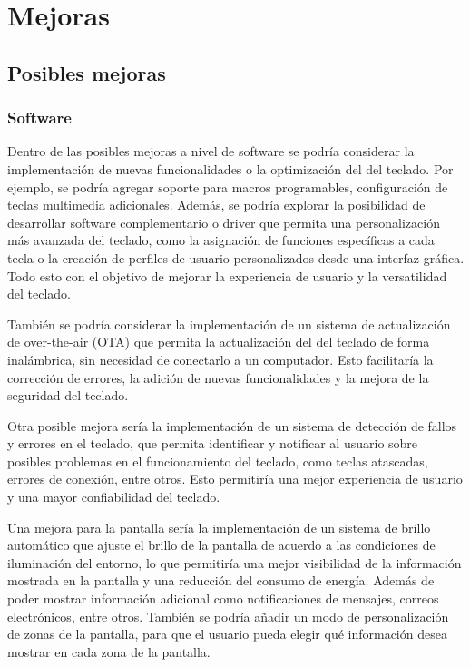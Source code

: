 \chapter{Mejoras}

\section{Posibles mejoras}
\subsection{Software}
Dentro de las posibles mejoras a nivel de software se podría considerar la implementación de nuevas funcionalidades o la optimización del  del teclado. Por ejemplo, se podría agregar soporte para macros programables, configuración de teclas multimedia adicionales. Además, se podría explorar la posibilidad de desarrollar software complementario o driver que permita una personalización más avanzada del teclado, como la asignación de funciones específicas a cada tecla o la creación de perfiles de usuario personalizados desde una interfaz gráfica. Todo esto con el objetivo de mejorar la experiencia de usuario y la versatilidad del teclado.

También se podría considerar la implementación de un sistema de actualización de  over-the-air (OTA) que permita la actualización del  del teclado de forma inalámbrica, sin necesidad de conectarlo a un computador. Esto facilitaría la corrección de errores, la adición de nuevas funcionalidades y la mejora de la seguridad del teclado.

Otra posible mejora sería la implementación de un sistema de detección de fallos y errores en el teclado, que permita identificar y notificar al usuario sobre posibles problemas en el funcionamiento del teclado, como teclas atascadas, errores de conexión, entre otros. Esto permitiría una mejor experiencia de usuario y una mayor confiabilidad del teclado.

Una mejora para la pantalla sería la implementación de un sistema de brillo automático que ajuste el brillo de la pantalla de acuerdo a las condiciones de iluminación del entorno, lo que permitiría una mejor visibilidad de la información mostrada en la pantalla y una reducción del consumo de energía. Además de poder mostrar información adicional como notificaciones de mensajes, correos electrónicos, entre otros. También se podría añadir un modo de personalización de zonas de la pantalla, para que el usuario pueda elegir qué información desea mostrar en cada zona de la pantalla.

